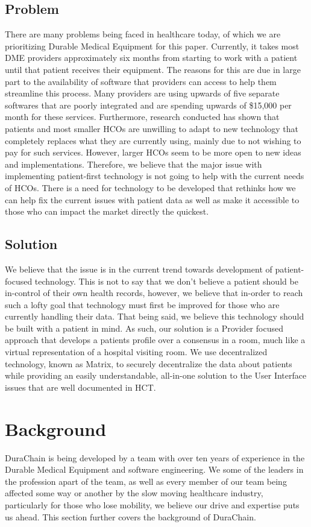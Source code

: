 \documentclass[12pt]{article}
\begin{document}
  \subsection{Problem}
  There are many problems being faced in healthcare today, of which we are prioritizing Durable Medical Equipment for this paper. Currently, it takes most DME providers approximately six months from starting to work with a patient until that patient receives their equipment. The reasons for this are due in large part to the availability of software that providers can access to help them streamline this process. Many providers are using upwards of five separate softwares that are poorly integrated and are spending upwards of \$15,000 per month for these services. Furthermore, research conducted has shown that patients and most smaller HCOs are unwilling to adapt to new technology that completely replaces what they are currently using, mainly due to not wishing to pay for such services. However, larger HCOs seem to be more open to new ideas and implementations. Therefore, we believe that the major issue with implementing patient-first technology is not going to help with the current needs of HCOs. There is a need for technology to be developed that rethinks how we can help fix the current issues with patient data as well as make it accessible to those who can impact the market directly the quickest.

  \subsection{Solution}
  We believe that the issue is in the current trend towards development of patient-focused technology. This is not to say that we don’t believe a patient should be in-control of their own health records, however, we believe that in-order to reach such a lofty goal that technology must first be improved for those who are currently handling their data. That being said, we believe this technology should be built with a patient in mind. As such, our solution is a Provider focused approach that develops a patients profile over a consensus in a room, much like a virtual representation of a hospital visiting room. We use decentralized technology, known as Matrix, to securely decentralize the data about patients while providing an easily understandable, all-in-one solution to the User Interface issues that are well documented in HCT.

\section{Background}
DuraChain is being developed by a team with over ten years of experience in the Durable Medical Equipment and software engineering. We some of the leaders in the profession apart of the team, as well as every member of our team being affected some way or another by the slow moving healthcare industry, particularly for those who lose mobility, we believe our drive and expertise puts us ahead. This section further covers the background of DuraChain.
\end{document}
